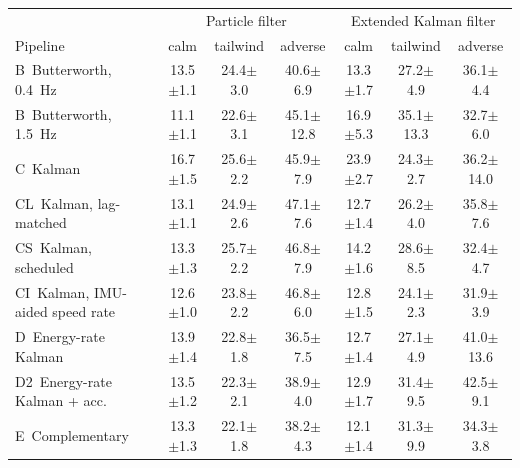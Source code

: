 \begin{tabular}{@{}lcccccc@{}}
\toprule
 & \multicolumn{3}{c}{Particle filter} & \multicolumn{3}{c}{Extended Kalman filter} \\
Pipeline & calm & tailwind & adverse & calm & tailwind & adverse \\
\midrule
B~Butterworth, 0.4~Hz & 13.5$\pm$1.1 & 24.4$\pm$3.0 & 40.6$\pm$6.9 & 13.3$\pm$1.7 & 27.2$\pm$4.9 & 36.1$\pm$4.4 \\
B~Butterworth, 1.5~Hz & 11.1$\pm$1.1 & 22.6$\pm$3.1 & 45.1$\pm$12.8 & 16.9$\pm$5.3 & 35.1$\pm$13.3 & 32.7$\pm$6.0 \\
C~Kalman & 16.7$\pm$1.5 & 25.6$\pm$2.2 & 45.9$\pm$7.9 & 23.9$\pm$2.7 & 24.3$\pm$2.7 & 36.2$\pm$14.0 \\
CL~Kalman, lag-matched & 13.1$\pm$1.1 & 24.9$\pm$2.6 & 47.1$\pm$7.6 & 12.7$\pm$1.4 & 26.2$\pm$4.0 & 35.8$\pm$7.6 \\
CS~Kalman, scheduled & 13.3$\pm$1.3 & 25.7$\pm$2.2 & 46.8$\pm$7.9 & 14.2$\pm$1.6 & 28.6$\pm$8.5 & 32.4$\pm$4.7 \\
CI~Kalman, IMU-aided speed rate & 12.6$\pm$1.0 & 23.8$\pm$2.2 & 46.8$\pm$6.0 & 12.8$\pm$1.5 & 24.1$\pm$2.3 & 31.9$\pm$3.9 \\
D~Energy-rate Kalman & 13.9$\pm$1.4 & 22.8$\pm$1.8 & 36.5$\pm$7.5 & 12.7$\pm$1.4 & 27.1$\pm$4.9 & 41.0$\pm$13.6 \\
D2~Energy-rate Kalman + acc. & 13.5$\pm$1.2 & 22.3$\pm$2.1 & 38.9$\pm$4.0 & 12.9$\pm$1.7 & 31.4$\pm$9.5 & 42.5$\pm$9.1 \\
E~Complementary & 13.3$\pm$1.3 & 22.1$\pm$1.8 & 38.2$\pm$4.3 & 12.1$\pm$1.4 & 31.3$\pm$9.9 & 34.3$\pm$3.8 \\
\bottomrule
\end{tabular}
